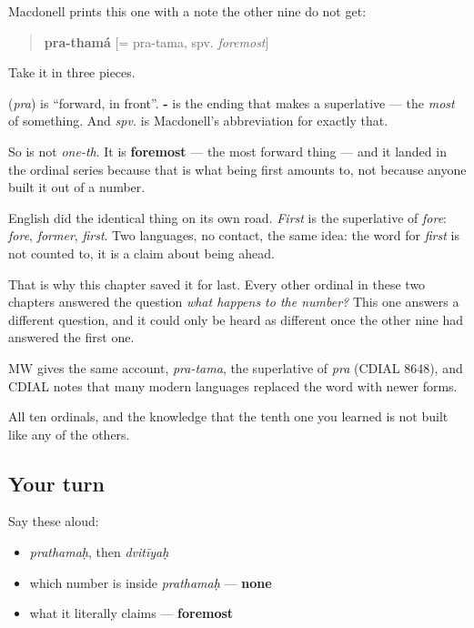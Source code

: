 \begin{cousinweb}
Macdonell prints this one with a note the other nine do not get:

\begin{quote}
\textbf{pra-thamá} {[}= pra-tama, spv. \emph{foremost}{]}
\end{quote}

Take it in three pieces.

\textbf{} (\emph{pra}) is \textquotedblleft{}forward, in front\textquotedblright{}. \textbf{-} is the ending that makes a superlative — the \emph{most} of something. And \emph{spv.} is Macdonell's abbreviation for exactly that.

So \textbf{} is not \emph{one-th}. It is \textbf{foremost} — the most forward thing — and it landed in the ordinal series because that is what being first amounts to, not because anyone built it out of a number.

English did the identical thing on its own road. \emph{First} is the superlative of \emph{fore}: \emph{fore}, \emph{former}, \emph{first}. Two languages, no contact, the same idea: the word for \emph{first} is not counted to, it is a claim about being ahead.

That is why this chapter saved it for last. Every other ordinal in these two chapters answered the question \emph{what happens to the number?} This one answers a different question, and it could only be heard as different once the other nine had answered the first one.

MW gives the same account, \emph{pra-tama}, the superlative of \emph{pra} (CDIAL 8648), and CDIAL notes that many modern languages replaced the word with newer forms.
\end{cousinweb}

\begin{grammarlens}[title={What you've built}]
All ten ordinals, and the knowledge that the tenth one you learned is not built like any of the others.
\end{grammarlens}

\subsection*{Your turn}
Say these aloud:

\begin{itemize}
\raggedright
  \item \emph{prathamaḥ}, then \emph{dvitīyaḥ}
  \item which number is inside \emph{prathamaḥ} — \textbf{none}
  \item what it literally claims — \textbf{foremost}
\end{itemize}

